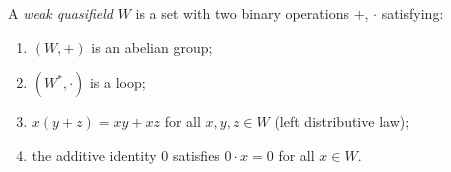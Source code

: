 A \emph{weak quasifield} $W$ is a set with two binary operations $+$, $\cdot$ satisfying:
\begin{enumerate}
\item $(W, +)$ is an abelian group;
\item $(W^*, \cdot)$ is a loop;
\item $x(y+z) = xy + xz$ for all $x, y, z \in W$ (left distributive law);
\item the additive identity $0$ satisfies $0 \cdot x = 0$ for all $x \in W$.
\end{enumerate}
